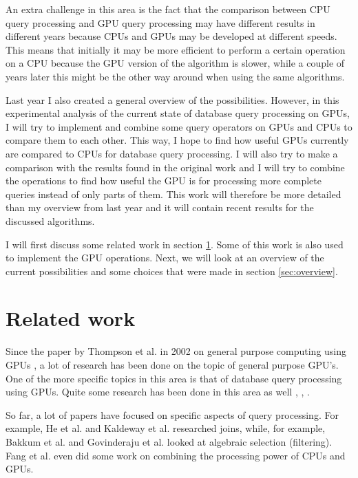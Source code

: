 \documentclass[a4paper,titlepage]{article}
\begin{document}
An extra challenge in this area is the fact that the comparison between CPU query processing and GPU query processing may have different results in different years because CPUs and GPUs may be developed at different speeds. This means that initially it may be more efficient to perform a certain operation on a CPU because the GPU version of the algorithm is slower, while a couple of years later this might be the other way around when using the same algorithms.

Last year I also created a general overview of the possibilities. However, in this experimental analysis of the current state of database query processing on GPUs, I will try to implement and combine some query operators on GPUs and CPUs to compare them to each other. This way, I hope to find how useful GPUs currently are compared to CPUs for database query processing. I will also try to make a comparison with the results found in the original work and I will try to combine the operations to find how useful the GPU is for processing more complete queries instead of only parts of them. This work will therefore be more detailed than my overview from last year and it will contain recent results for the discussed algorithms.

I will first discuss some related work in section \ref{sec:related-work}. Some of this work is also used to implement the GPU operations. Next, we will look at an overview of the current possibilities and some choices that were made in section \ref{sec:overview}. %

\section{Related work}
\label{sec:related-work}
Since the paper by Thompson et al. in 2002 on general purpose computing using GPUs \cite{thompson2002}, a lot of research has been done on the topic of general purpose GPU's. One of the more specific topics in this area is that of database query processing using GPUs. Quite some research has been done in this area as well \cite{bakkum2010}, \cite{fang2007}, \cite{kaldeway2010}. 

So far, a lot of papers have focused on specific aspects of query processing. For example, He et al. \cite{he2008} and Kaldeway et al. \cite{kaldeway2010} researched joins, while, for example, Bakkum et al. \cite{bakkum2010} and Govinderaju et al. \cite{govindaraju2004} looked at algebraic selection (filtering).  Fang et al. \cite{fang2007} even did some work on combining the processing power of CPUs and GPUs.
\end{document}
